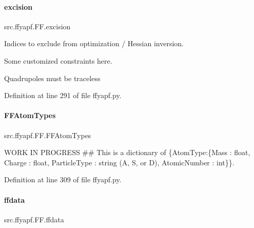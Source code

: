 \mbox{\label{classsrc_1_1ffyapf_1_1FF_acdf033be42f6827dbd150984f52f4076}} 
\paragraph{\texorpdfstring{excision}{excision}}
{\footnotesize\ttfamily src.\+ffyapf.\+F\+F.\+excision}



Indices to exclude from optimization / Hessian inversion. 

Some customized constraints here.

Quadrupoles must be traceless 

Definition at line 291 of file ffyapf.\+py.

\mbox{\label{classsrc_1_1ffyapf_1_1FF_a978f71c36052e6e8d93da8baeef6c3d1}} 
\paragraph{\texorpdfstring{F\+F\+Atom\+Types}{FFAtomTypes}}
{\footnotesize\ttfamily src.\+ffyapf.\+F\+F.\+F\+F\+Atom\+Types}



W\+O\+RK IN P\+R\+O\+G\+R\+E\+SS \#\# This is a dictionary of \{\textquotesingle{}Atom\+Type\textquotesingle{}\+:\{\textquotesingle{}Mass\textquotesingle{} \+: float, \textquotesingle{}Charge\textquotesingle{} \+: float, \textquotesingle{}Particle\+Type\textquotesingle{} \+: string (\textquotesingle{}A\textquotesingle{}, \textquotesingle{}S\textquotesingle{}, or \textquotesingle{}D\textquotesingle{}), \textquotesingle{}Atomic\+Number\textquotesingle{} \+: int\}\}. 



Definition at line 309 of file ffyapf.\+py.

\mbox{\label{classsrc_1_1ffyapf_1_1FF_a68a3599d8d9a86173693142888875a75}} 
\paragraph{\texorpdfstring{ffdata}{ffdata}}
{\footnotesize\ttfamily src.\+ffyapf.\+F\+F.\+ffdata}



